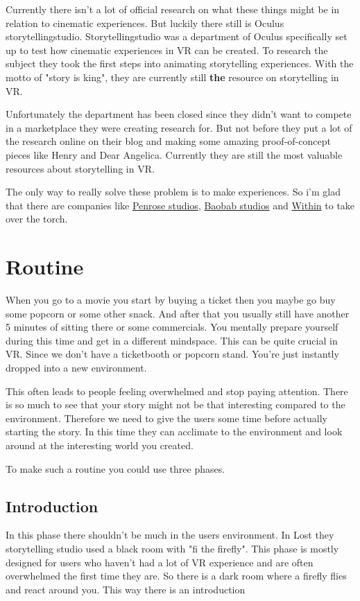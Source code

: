 \documentclass{report}
\begin{document}
				Currently there isn't a lot of official research on what these things might be in relation to cinematic experiences. But luckily there still is Oculus storytellingstudio. Storytellingstudio was a department of Oculus specifically set up to test how cinematic experiences in VR can be created. To research the subject they took the first steps into animating storytelling experiences. With the motto of "story is king", they are currently still \textbf{the} resource on storytelling in VR. 
				
				Unfortunately the department has been closed since they didn't want to compete in a marketplace they were creating research for. But not before they put a lot of the research online on their blog and making some amazing proof-of-concept pieces like Henry and Dear Angelica. Currently they are still the most valuable resources about storytelling in VR.
				
				The only way to really solve these problem is to make experiences. So i'm glad that there are companies like \href{http://www.penrosestudios.com/}{Penrose studios}, \href{http://www.baobabstudios.com/}{Baobab studios} and \href{https://with.in/}{Within} to take over the torch.

				\section{Routine}\label{chap:Routine}
				
				When you go to a movie you start by buying a ticket then you maybe go buy some popcorn or some other snack. And after that you usually still have another 5 minutes of sitting there or some commercials. You mentally prepare yourself during this time and get in a different mindspace. This can be quite crucial in VR. Since we don't have a ticketbooth or popcorn stand. You're just instantly dropped into a new environment. 
				
				This often leads to people feeling overwhelmed and stop paying attention. There is so much to see that your story might not be that interesting compared to the environment. Therefore we need to give the users some time before actually starting the story. In this time they can acclimate to the environment and look around at the interesting world you created.
				
				To make such a routine you could use three phases.
				
				\subsection{Introduction}
				In this phase there shouldn't be much in the users environment. In Lost they storytelling studio used a black room with "fi the firefly". This phase is mostly designed for users who haven't had a lot of VR experience and are often overwhelmed the first time they are. So there is a dark room where a firefly flies and react around you. This way there is an introduction
				
\end{document}
